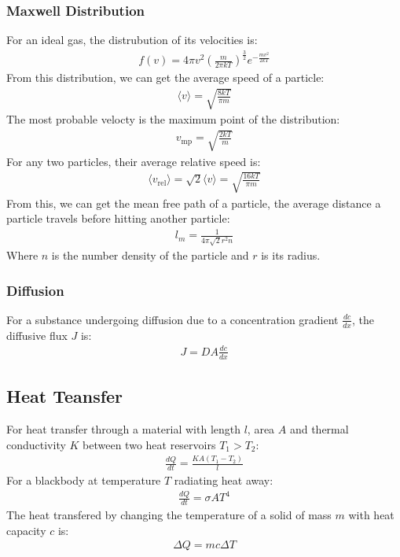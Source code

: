 \documentclass[a4paper]{article}
\newcommand{\ave}[1]{
  \ensuremath{\langle #1 \rangle}}     %
\begin{document}
\begin{multicols*}{2}
\subsubsection{Maxwell Distribution}
For an ideal gas, the distrubution of its velocities is:
\begin{align*}
  f(v) = 4 \pi v^2 \left( \frac{m}{2 \pi kT} \right)^{\frac{3}{2}}
  e^{-\frac{mv^2}{2kT}}
\end{align*}
From this distribution, we can get the average speed of a particle:
\begin{align*}
  \ave{ v } = \sqrt{\frac{8kT}{\pi m}}
\end{align*}
The most probable velocty is the maximum point of the distribution:
\begin{align*}
  v_{\text{mp}} = \sqrt{\frac{2kT}{m}}
\end{align*}
For any two particles, their average relative speed is:
\begin{align*}
  \ave{ v_{\text{rel}} } = \sqrt{2} \ave{ v } = \sqrt{\frac{16kT}{\pi m}}
\end{align*}
From this, we can get the mean free path of a particle, the average distance a
particle travels before hitting another particle:
\begin{align*}
  l_m = \frac{1}{4 \pi \sqrt{2} r^2 n}
\end{align*}
Where $n$ is the number density of the particle and $r$ is its radius.
\subsubsection{Diffusion}
For a substance undergoing diffusion due to a concentration gradient
$\frac{dc}{dx}$, the diffusive flux $J$ is:
\begin{align*}
  J = D A \frac{dc}{dx}
\end{align*}
\subsection{Heat Teansfer}
For heat transfer through a material with length $l$, area $A$ and thermal
conductivity $K$ between two heat reservoirs $T_1 > T_2$:
\begin{align*}
  \frac{dQ}{dt} = \frac{KA (T_1 - T_2)}{l}
\end{align*}
For a blackbody at temperature $T$ radiating heat away:
\begin{align*}
  \frac{dQ}{dt} = \sigma A T^4
\end{align*}
The heat transfered by changing the temperature of a solid of mass $m$ with heat
capacity $c$ is:
\begin{align*}
  \Delta Q = mc \Delta T
\end{align*}

\end{multicols*}
\end{document}
